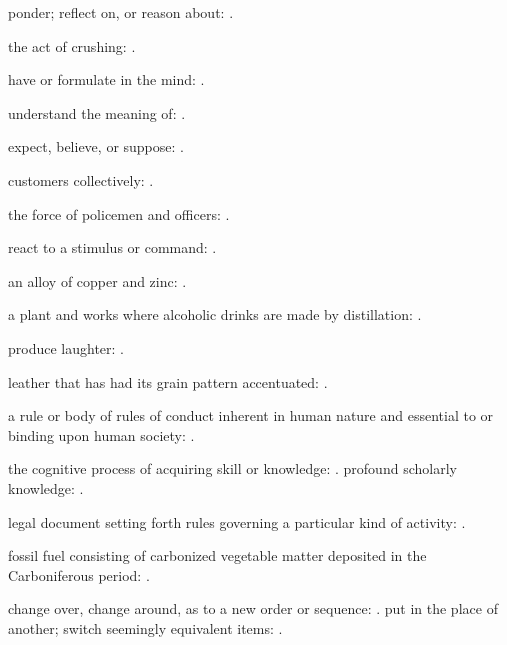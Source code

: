   ponder; reflect on, or reason about: .

  the act of crushing:   .

  have or formulate in the mind: .

  understand the meaning of:   .

  expect, believe, or suppose:   .

  customers collectively:   .

  the force of policemen and officers:   .

  react to a stimulus or command: .

  an alloy of copper and zinc: .

  a plant and works where alcoholic drinks are made by distillation:   .

  produce laughter:   .

  leather that has had its grain pattern accentuated:   .

  a rule or body of rules of conduct inherent in human nature and essential to or binding upon human society:   .

  the cognitive process of acquiring skill or knowledge:   . profound scholarly knowledge:   .

  legal document setting forth rules governing a particular kind of activity: .

  fossil fuel consisting of carbonized vegetable matter deposited in the Carboniferous period: .

  change over, change around, as to a new order or sequence:   . put in the place of another; switch seemingly equivalent items:   .

